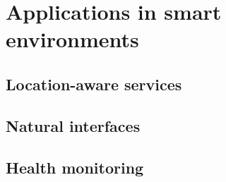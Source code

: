 \section{Applications in smart environments}
\subsection{Location-aware services}
\subsection{Natural interfaces}
\subsection{Health monitoring}
